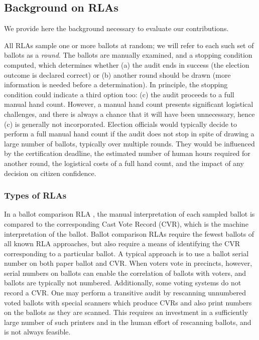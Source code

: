 \subsection{Background on RLAs}
We provide here the background necessary to evaluate our contributions. 

All RLAs sample one or more ballots at random; we will refer to each such set of ballots as a {\em round}. The ballots are manually examined, and a stopping condition computed, which determines whether (a) the audit ends in success (the election outcome is declared correct) or (b) another round should be drawn (more information is needed before a determination). In principle, the stopping condition could indicate a third option too: (c) the audit proceeds to a full manual hand count. However, a manual hand count presents significant logistical challenges, and there is always a chance that it will have been unnecessary, hence (c) is generally not incorporated. Election officials would typically decide to perform a full manual hand count if the audit does not stop in spite of drawing a large number of ballots, typically over multiple rounds. They would be influenced by the certification deadline, the estimated number of human hours required for another round, the logistical costs of a full hand count, and the impact of any decision on citizen confidence. 

\subsubsection{Types of RLAs}
In a ballot comparison RLA \cite{RLA}, the manual interpretation of each sampled ballot is compared to the corresponding Cast Vote Record (CVR), which is the machine interpretation of the ballot. Ballot comparison RLAs require the fewest ballots of all known RLA approaches, but also require a means of identifying the CVR corresponding to a particular ballot. A typical approach is to use a ballot serial number on both paper ballot and CVR. When voters vote in precincts, however, serial numbers on ballots can enable the correlation of ballots with voters, and ballots are typically not numbered. Additionally, some voting systems do not record a CVR. One may perform a transitive audit by rescanning unnumbered voted ballots with special scanners which produce CVRs and also print numbers on the ballots as they are scanned. This requires an investment in a sufficiently large number of such printers and in the human effort of rescanning ballots, and is not always feasible. 

